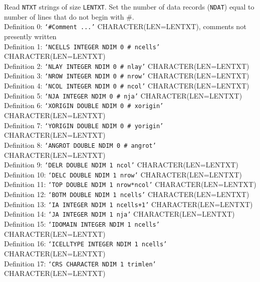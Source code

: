 \vspace{5mm}
\noindent Read \texttt{NTXT} strings of size \texttt{LENTXT}. Set the number of data records (\texttt{NDAT}) equal to number of lines that do not begin with \#.  \\
\noindent Definition 0: \texttt{`\#Comment ...'} {\color{red} \footnotesize{CHARACTER(LEN=LENTXT)}, comments not presently written} \\
\noindent Definition 1: \texttt{`NCELLS INTEGER NDIM 0 \# ncells'} {\color{red} \footnotesize{CHARACTER(LEN=LENTXT)}} \\
\noindent Definition 2: \texttt{`NLAY INTEGER NDIM 0 \# nlay'} {\color{red} \footnotesize{CHARACTER(LEN=LENTXT)}} \\
\noindent Definition 3: \texttt{`NROW INTEGER NDIM 0 \# nrow'} {\color{red} \footnotesize{CHARACTER(LEN=LENTXT)}} \\
\noindent Definition 4: \texttt{`NCOL INTEGER NDIM 0 \# ncol'} {\color{red} \footnotesize{CHARACTER(LEN=LENTXT)}} \\
\noindent Definition 5: \texttt{`NJA INTEGER NDIM 0 \# nja'} {\color{red} \footnotesize{CHARACTER(LEN=LENTXT)}} \\
\noindent Definition 6: \texttt{`XORIGIN DOUBLE NDIM 0 \# xorigin'} {\color{red} \footnotesize{CHARACTER(LEN=LENTXT)}} \\
\noindent Definition 7: \texttt{`YORIGIN DOUBLE NDIM 0 \# yorigin'} {\color{red} \footnotesize{CHARACTER(LEN=LENTXT)}} \\
\noindent Definition 8: \texttt{`ANGROT DOUBLE NDIM 0 \# angrot'} {\color{red} \footnotesize{CHARACTER(LEN=LENTXT)}} \\
\noindent Definition 9: \texttt{`DELR DOUBLE NDIM 1 ncol'} {\color{red} \footnotesize{CHARACTER(LEN=LENTXT)}} \\
\noindent Definition 10: \texttt{`DELC DOUBLE NDIM 1 nrow'} {\color{red} \footnotesize{CHARACTER(LEN=LENTXT)}} \\
\noindent Definition 11: \texttt{`TOP DOUBLE NDIM 1 nrow*ncol'} {\color{red} \footnotesize{CHARACTER(LEN=LENTXT)}} \\
\noindent Definition 12: \texttt{`BOTM DOUBLE NDIM 1 ncells'} {\color{red} \footnotesize{CHARACTER(LEN=LENTXT)}} \\
\noindent Definition 13: \texttt{`IA INTEGER NDIM 1 ncells+1'} {\color{red} \footnotesize{CHARACTER(LEN=LENTXT)}} \\
\noindent Definition 14: \texttt{`JA INTEGER NDIM 1 nja'} {\color{red} \footnotesize{CHARACTER(LEN=LENTXT)}} \\
\noindent Definition 15: \texttt{`IDOMAIN INTEGER NDIM 1 ncells'} {\color{red} \footnotesize{CHARACTER(LEN=LENTXT)}} \\
\noindent Definition 16: \texttt{`ICELLTYPE INTEGER NDIM 1 ncells'} {\color{red} \footnotesize{CHARACTER(LEN=LENTXT)}} \\
\noindent Definition 17: \texttt{`CRS CHARACTER NDIM 1 trimlen'} {\color{red} \footnotesize{CHARACTER(LEN=LENTXT)}} \\

